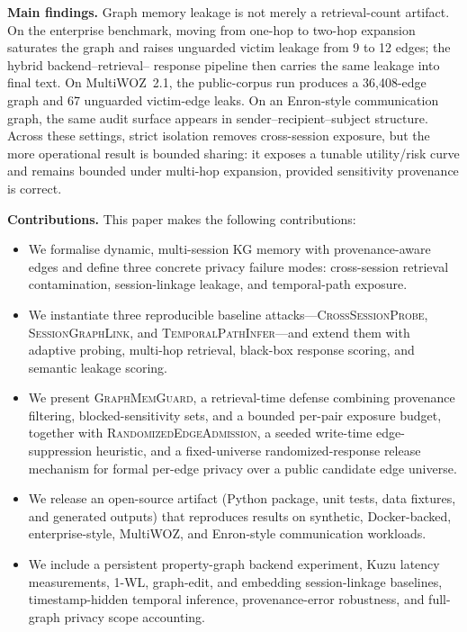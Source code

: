 \documentclass[journal,10pt,twocolumn]{IEEEtran}
\begin{document}
\noindent\textbf{Main findings.} Graph memory leakage is not merely a
retrieval-count artifact. On the enterprise benchmark, moving from
one-hop to two-hop expansion saturates the graph and raises unguarded
victim leakage from 9 to 12 edges; the hybrid backend--retrieval--
response pipeline then carries the same leakage into final text. On
MultiWOZ~2.1, the public-corpus run produces a 36,408-edge graph and
67 unguarded victim-edge leaks. On an Enron-style communication graph,
the same audit surface appears in sender--recipient--subject
structure. Across these settings, strict isolation removes
cross-session exposure, but the more operational result is bounded
sharing: it exposes a tunable utility/risk curve and remains bounded
under multi-hop expansion, provided sensitivity provenance is correct.

\noindent\textbf{Contributions.} This paper makes the following
contributions:

\begin{itemize}
    \item We formalise dynamic, multi-session KG memory with
    provenance-aware edges and define three concrete privacy failure
    modes: cross-session retrieval contamination, session-linkage
    leakage, and temporal-path exposure.
    \item We instantiate three reproducible baseline
    attacks---\textsc{CrossSessionProbe},
    \textsc{SessionGraphLink}, and
    \textsc{TemporalPathInfer}---and extend them with adaptive
    probing, multi-hop retrieval, black-box response scoring, and
    semantic leakage scoring.
    \item We present \textsc{GraphMemGuard}, a retrieval-time defense
    combining provenance filtering, blocked-sensitivity sets, and a
    bounded per-pair exposure budget, together with
    \textsc{RandomizedEdgeAdmission}, a seeded write-time
    edge-suppression heuristic, and a fixed-universe randomized-response
    release mechanism for formal per-edge privacy over a public
    candidate edge universe.
    \item We release an open-source artifact (Python package, unit
    tests, data fixtures, and generated outputs) that reproduces
    results on synthetic, Docker-backed, enterprise-style, MultiWOZ,
    and Enron-style communication workloads.
    \item We include a persistent property-graph backend experiment,
    Kuzu latency measurements, 1-WL, graph-edit, and embedding
    session-linkage baselines, timestamp-hidden temporal inference,
    provenance-error robustness, and full-graph privacy scope
    accounting.
\end{itemize}
\end{document}
